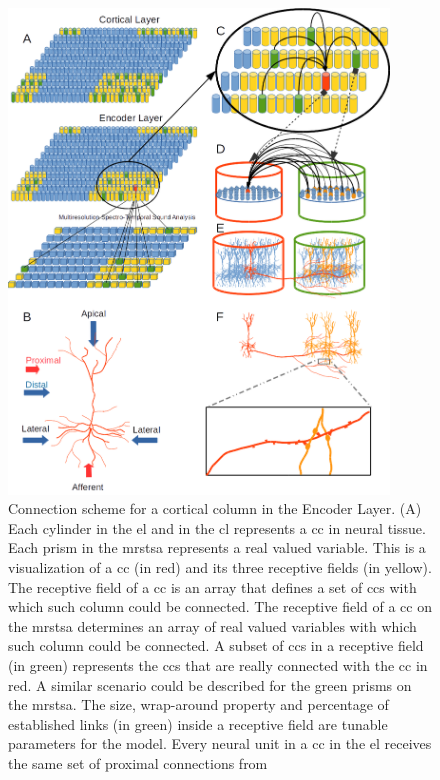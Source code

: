 \documentclass[10pt,letterpaper]{article}
\begin{document}
\pagebreak


\iffalse
\begin{figure}[h!]
    \centering
    \includegraphics[width=0.9\textwidth]{Connectivity.png}
    \caption{\tiny Connection scheme for a cortical column in the Encoder Layer.
	    (A) Each cylinder in the \gls{el} and in the \gls{cl} represents a \gls{cc} in neural tissue.
	    Each prism in the \gls{mrstsa} represents a real valued variable.
	    This is a visualization of a \gls{cc} (in red) and its three receptive fields (in yellow).
	    The receptive field of a \gls{cc} is an array that defines a set of \glspl{cc}
	    with which such column could be connected.
	    The receptive field of a \gls{cc} on the \gls{mrstsa} determines an array of real valued variables
	    with which such column could be connected.
    A subset of \glspl{cc} in a receptive field (in green) represents the \glspl{cc} that are really
    connected with the \gls{cc} in red. A similar scenario could be described for the green prisms on
    the \gls{mrstsa}.
    The size, wrap-around property and percentage of established links (in green) inside a receptive field are tunable parameters for the model.
    Every neural unit in a \gls{cc} in the \gls{el} receives the same set of proximal connections from
}
\end{figure}
\end{document}

